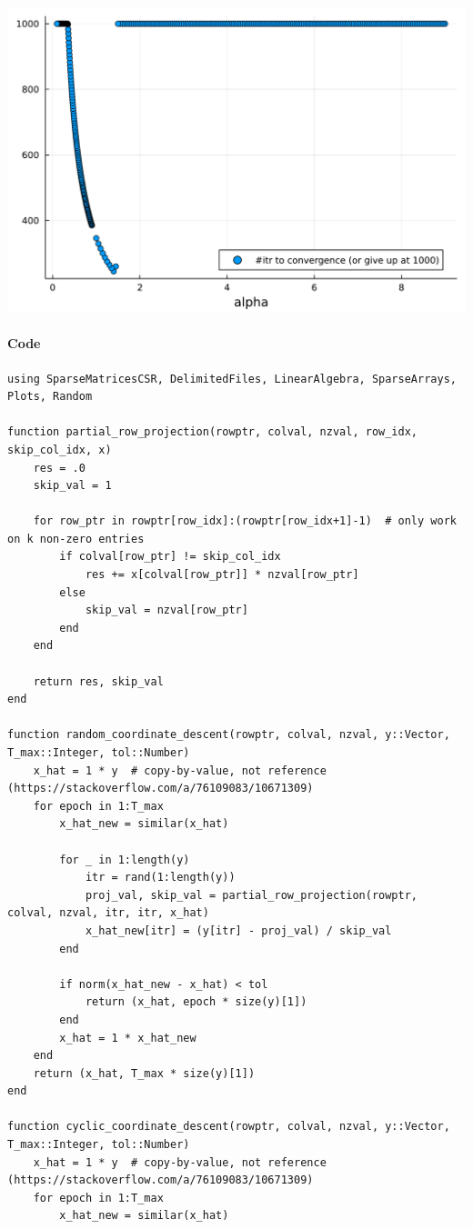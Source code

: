 \documentclass[]{exam}
\let\oldparagraph\paragraph
\renewcommand{\paragraph}[1]{\oldparagraph{#1}\mbox{}}
\begin{document}
\begin{questions}
\begin{center}
	\includegraphics[width=.7\textwidth]{code/q5-1.pdf}
\end{center}

\newpage
\question
\hfill

\paragraph{Code}
\begin{lstlisting}
using SparseMatricesCSR, DelimitedFiles, LinearAlgebra, SparseArrays, Plots, Random

function partial_row_projection(rowptr, colval, nzval, row_idx, skip_col_idx, x)
	res = .0
	skip_val = 1

	for row_ptr in rowptr[row_idx]:(rowptr[row_idx+1]-1)  # only work on k non-zero entries
		if colval[row_ptr] != skip_col_idx
			res += x[colval[row_ptr]] * nzval[row_ptr]
		else
			skip_val = nzval[row_ptr]
		end
	end

	return res, skip_val
end

function random_coordinate_descent(rowptr, colval, nzval, y::Vector, T_max::Integer, tol::Number)
	x_hat = 1 * y  # copy-by-value, not reference (https://stackoverflow.com/a/76109083/10671309)
	for epoch in 1:T_max
		x_hat_new = similar(x_hat)

		for _ in 1:length(y)
			itr = rand(1:length(y))
			proj_val, skip_val = partial_row_projection(rowptr, colval, nzval, itr, itr, x_hat)
			x_hat_new[itr] = (y[itr] - proj_val) / skip_val
		end

		if norm(x_hat_new - x_hat) < tol
			return (x_hat, epoch * size(y)[1])
		end
		x_hat = 1 * x_hat_new
	end
	return (x_hat, T_max * size(y)[1])
end

function cyclic_coordinate_descent(rowptr, colval, nzval, y::Vector, T_max::Integer, tol::Number)
	x_hat = 1 * y  # copy-by-value, not reference (https://stackoverflow.com/a/76109083/10671309)
	for epoch in 1:T_max
		x_hat_new = similar(x_hat)


\end{lstlisting}
\end{questions}
\end{document}
